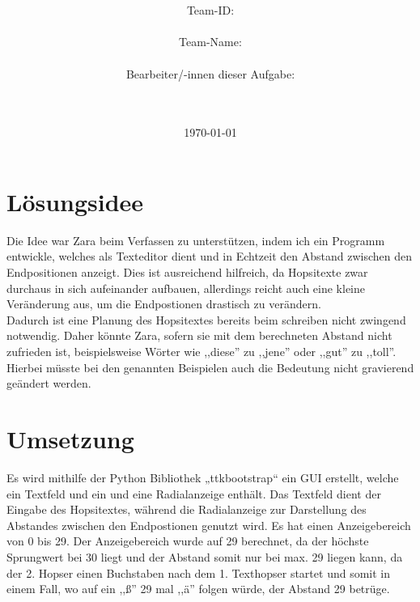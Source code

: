 \documentclass[a4paper,10pt,ngerman]{scrartcl}
\title{\textbf{\Huge\Aufgabe}}
\author{\LARGE Team-ID: \LARGE \TeamId \\\\
	\LARGE Team-Name: \LARGE \TeamName \\\\
	\LARGE Bearbeiter/-innen dieser Aufgabe: \\ 
	\LARGE \Namen\\\\}
\date{\LARGE\today}
\begin{document}
\maketitle
\tableofcontents

\vspace{0.5cm}


\section{Lösungsidee}
Die Idee war Zara beim Verfassen zu unterstützen, indem ich ein Programm entwickle, welches 
als Texteditor dient und in Echtzeit den Abstand zwischen den Endpositionen anzeigt.
Dies ist ausreichend hilfreich, da Hopsitexte zwar durchaus in sich aufeinander aufbauen, allerdings reicht auch eine kleine Veränderung aus, um die Endpostionen drastisch zu verändern.\\
Dadurch ist eine Planung des Hopsitextes bereits beim schreiben nicht zwingend notwendig.
Daher könnte Zara, sofern sie mit dem berechneten Abstand nicht zufrieden ist, beispielsweise
 Wörter wie ,,diese'' zu ,,jene'' oder ,,gut'' zu ,,toll''. Hierbei müsste bei den genannten 
 Beispielen auch die Bedeutung nicht gravierend geändert werden.

\section{Umsetzung}
Es wird mithilfe der Python Bibliothek „ttkbootstrap“ ein GUI erstellt, welche ein Textfeld und ein 
und eine Radialanzeige enthält. Das Textfeld dient der Eingabe des Hopsitextes, während die Radialanzeige
zur Darstellung des Abstandes zwischen den Endpostionen genutzt wird. Es hat einen Anzeigebereich von 0 bis 
29. Der Anzeigebereich wurde auf 29 berechnet, da der höchste Sprungwert bei 30 liegt und der Abstand somit
nur bei max. 29 liegen kann, da der 2. Hopser einen Buchstaben nach dem 1. Texthopser startet und somit in einem Fall,
 wo auf ein ,,ß'' 29 mal ,,ä'' folgen würde, der Abstand 29 betrüge.
\end{document}
